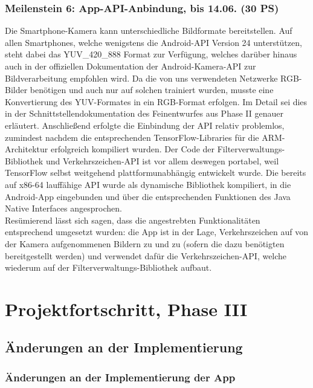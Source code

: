 \documentclass[12pt,a4paper,ngerman,enabledeprecatedfontcommands]{scrreprt}
\begin{document}
\section[Meilenstein 6: App-API-Anbindung]{Meilenstein 6: App-API-Anbindung, bis 14.06. (30 PS)}
Die \gls{Smartphone}-Kamera kann unterschiedliche Bildformate bereitstellen. Auf allen Smartphones, welche wenigstens die Android-\gls{API} Version 24 unterstützen, steht dabei das YUV\_420\_888 Format zur Verfügung, welches darüber hinaus auch in der offiziellen Dokumentation der Android-Kamera-\gls{API} zur Bildverarbeitung empfohlen wird. Da die von uns verwendeten Netzwerke RGB-Bilder benötigen und auch nur auf solchen trainiert wurden, musste eine Konvertierung des YUV-Formates in ein RGB-Format erfolgen. Im Detail sei dies in der Schnittstellendokumentation des Feinentwurfes aus Phase II genauer erläutert. Anschließend erfolgte die Einbindung der API relativ problemlos, zumindest nachdem die entsprechenden TensorFlow-Libraries für die \gls{ARM}-Architektur erfolgreich kompiliert wurden. Der Code der \gls{Filterverwaltungs-Bibliothek} und \gls{Verkehrszeichen-API} ist vor allem deswegen portabel, weil TensorFlow selbst weitgehend plattformunabhängig entwickelt wurde. Die bereits auf x86-64 lauffähige \gls{API} wurde als dynamische Bibliothek kompiliert, in die Android-\gls{App} eingebunden und über die entsprechenden Funktionen des Java Native Interfaces angesprochen.\\
Resümierend lässt sich sagen, dass die angestrebten Funktionalitäten entsprechend umgesetzt wurden: die \gls{App} ist in der Lage, Verkehrszeichen auf von der Kamera aufgenommenen Bildern zu  und zu  (sofern die dazu benötigten  bereitgestellt werden) und verwendet dafür die \gls{Verkehrszeichen-API}, welche wiederum auf der \gls{Filterverwaltungs-Bibliothek} aufbaut.


\part{Projektfortschritt, Phase III}

\chapter{Änderungen an der Implementierung}

\section{Änderungen an der Implementierung der App}
\end{document}
